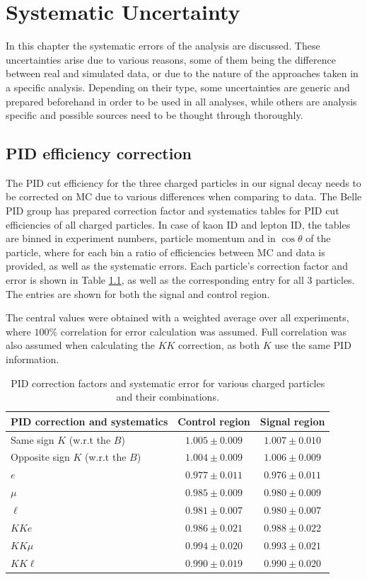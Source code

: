 \chapter{Systematic Uncertainty}
In this chapter the systematic errors of the analysis are discussed. These uncertainties arise due to various reasons, some of them being the difference between real and simulated data, or due to the nature of the approaches taken in a specific analysis. Depending on their type, some uncertainties are generic and prepared beforehand in order to be used in all analyses, while others are analysis specific and possible sources need to be thought through thoroughly. 

\section{PID efficiency correction}

The PID cut efficiency for the three charged particles in our signal decay needs to be corrected on MC due to various differences when comparing to data. The Belle PID group has prepared correction factor and systematics tables for PID cut efficiencies of all charged particles. In case of kaon ID and lepton ID, the tables are binned in experiment numbers, particle momentum and in $\cos\theta$ of the particle, where for each bin a ratio of efficiencies between MC and data is provided, as well as the systematic errors. Each particle's correction factor and error is shown in Table \ref{tab:PID}, as well as the corresponding entry for all 3 particles. The entries are shown for both the signal and control region.

The central values were obtained with a weighted average over all experiments, where $100\%$ correlation for error calculation was assumed. Full correlation was also assumed when calculating the $KK$ correction, as both $K$ use the same PID information.

\begin{table}[H]
	\centering
	\begin{tabular}{|l|c|c|}
		\hline
		PID correction and systematics & Control region & Signal region \\
		\hline
		Same sign $K$ (w.r.t the $B$) & $1.005\pm 0.009$ & $1.007\pm 0.010$\\
		\hline
		Opposite sign $K$ (w.r.t the $B$) & $1.004\pm 0.009$ & $1.006\pm 0.009$\\
		\hline
		$e$ & $0.977\pm 0.011$ & $0.976\pm 0.011$\\
		\hline
		$\mu$ & $0.985\pm 0.009$ & $0.980\pm 0.009$\\
		\hline
        $\ell$ & $0.981\pm 0.007$ & $0.980\pm 0.007$\\
		\hline
		\hline
		$KKe$ & $0.986 \pm 0.021$ & $0.988\pm 0.022$\\
		\hline
		$KK\mu$ & $0.994 \pm 0.020$ & $0.993\pm 0.021$\\
		\hline
		$KK\ell$ & $0.990 \pm 0.019$ & $0.990\pm 0.020$\\
		\hline
	\end{tabular}
	\caption{PID correction factors and systematic error for various charged particles and their combinations.}
	\label{tab:PID}
\end{table}

